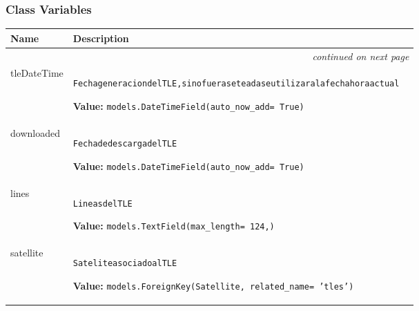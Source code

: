   \subsubsection{Class Variables}

    \vspace{-1cm}
\hspace{\varindent}\begin{longtable}{|p{\varnamewidth}|p{\vardescrwidth}|l}
\cline{1-2}
\cline{1-2} \centering \textbf{Name} & \centering \textbf{Description}& \\
\cline{1-2}
\endhead\cline{1-2}\multicolumn{3}{r}{\small\textit{continued on next page}}\\\endfoot\cline{1-2}
\endlastfoot\raggedright t\-l\-e\-D\-a\-t\-e\-T\-i\-m\-e\- & \raggedright \begin{alltt}

Fecha generacion del TLE, si no fuera seteada se utilizara la fecha hora actual
\end{alltt}

\textbf{Value:} 
{\tt models.DateTimeField(auto\_now\_add= True)}&\\
\cline{1-2}
\raggedright d\-o\-w\-n\-l\-o\-a\-d\-e\-d\- & \raggedright \begin{alltt}

Fecha de descarga del TLE
\end{alltt}

\textbf{Value:} 
{\tt models.DateTimeField(auto\_now\_add= True)}&\\
\cline{1-2}
\raggedright l\-i\-n\-e\-s\- & \raggedright \begin{alltt}

Lineas del TLE
\end{alltt}

\textbf{Value:} 
{\tt models.TextField(max\_length= 124,)}&\\
\cline{1-2}
\raggedright s\-a\-t\-e\-l\-l\-i\-t\-e\- & \raggedright \begin{alltt}

Satelite asociado al TLE
\end{alltt}

\textbf{Value:} 
{\tt models.ForeignKey(Satellite, related\_name= 'tles')}&\\
\cline{1-2}
\end{longtable}

